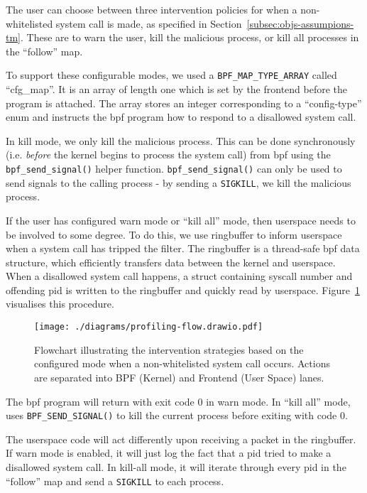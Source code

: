 The user can choose between three intervention policies for when a
non-whitelisted system call is made, as specified in 
Section~\ref{subsec:objs-assumpions-tm}. These are to warn the user, kill the
malicious process, or kill all processes in the ``follow'' map.

To support these configurable modes, we used a \texttt{BPF\_MAP\_TYPE\_ARRAY}
called ``cfg\_map''. It is an array of length one which is set by the frontend
before the program is attached. The array stores an integer corresponding to
a ``config-type'' enum and instructs the \ac{bpf} program how to respond to a
disallowed system call.

In kill mode, we only kill the malicious process. This can be done synchronously
(i.e. \textit{before} the kernel begins to process the system call) from \ac{bpf}
using the \texttt{bpf\_send\_signal()} helper function. 
\texttt{bpf\_send\_signal()} can only be used to send signals to the calling
process - by sending a \texttt{SIGKILL}, we kill the malicious process.

If the user has configured warn mode or ``kill all'' mode, then userspace needs
to be involved to some degree. To do this, we use  ringbuffer to inform
userspace when a system call has tripped the filter. The ringbuffer is a thread-safe
\ac{bpf} data structure, which efficiently transfers data between the kernel and
userspace. When a disallowed system call happens, a struct containing syscall
number and offending \ac{pid} is written to the ringbuffer and quickly read by
userspace. Figure~\ref{fig:intervention-flowchart} visualises this procedure.

\begin{figure}[h]
\centering
\texttt{[image: ./diagrams/profiling-flow.drawio.pdf]} 
\caption{Flowchart illustrating the intervention strategies based on the
configured mode when a non-whitelisted system call occurs. Actions are separated
into BPF (Kernel) and Frontend (User Space) lanes.}
\label{fig:intervention-flowchart}
\end{figure}

The \ac{bpf} program will return with exit code 0 in warn mode. In ``kill
all'' mode, \af uses \texttt{BPF\_SEND\_SIGNAL()} to kill the current process
before exiting with code 0.

The userspace code will act differently upon receiving a packet in the
ringbuffer. If warn mode is enabled, it will just log the fact that a \ac{pid}
tried to make a disallowed system call. In kill-all mode, it will iterate through
every \ac{pid} in the ``follow'' map and send a \texttt{SIGKILL} to each
process.

